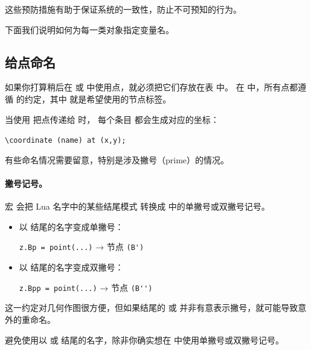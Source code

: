 这些预防措施有助于保证系统的一致性，防止不可预知的行为。

\vspace{1em}
下面我们说明如何为每一类对象指定变量名。


\subsection{给点命名}

如果你打算稍后在 \tkzNamePack{\TIKZ} 或  中使用点，就必须把它们存放在表  中。
在  中，所有点都遵循  的约定，其中  就是希望使用的节点标签。

\medskip
当使用  把点传递给 \TIKZ{} 时，
每个条目  都会生成对应的坐标：

\begin{mybox}
\verb|\coordinate (name) at (x,y);|
\end{mybox}

有些命名情况需要留意，特别是涉及撇号（prime）的情况。

\paragraph{撇号记号。}

宏  会把 Lua 名字中的某些结尾模式
转换成 \TIKZ{} 中的单撇号或双撇号记号。

\begin{itemize}
  \item 以  结尾的名字变成单撇号：
        \begin{mybox}
        \verb|z.Bp = point(...)|  →  节点 \verb|(B')|
        \end{mybox}

  \item 以  结尾的名字变成双撇号：
        \begin{mybox}
        \verb|z.Bpp = point(...)| → 节点 \verb|(B'')|
        \end{mybox}
\end{itemize}

这一约定对几何作图很方便，但如果结尾的  或  并非有意表示撇号，就可能导致意外的重命名。

\begin{tcolorbox}[colback=red!7,colframe=red!60!black,title=警告]
避免使用以  或  结尾的名字，除非你确实想在 \TIKZ{} 中使用单撇号或双撇号记号。
\end{tcolorbox}

